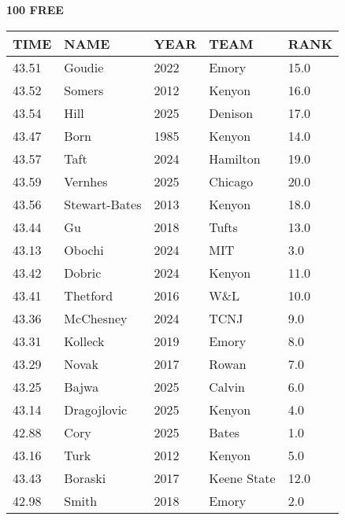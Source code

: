 \begin{table}[H]
\begin{minipage}[t]{0.48\textwidth}
\centering
\textbf{100 FREE}\\[0.1cm]
\begin{tabular}{@{}p{1.8cm}p{2.8cm}p{1.2cm}p{1.4cm}p{0.8cm}@{}}
\hline
    \textbf{TIME} & \textbf{NAME} & \textbf{YEAR} & \textbf{TEAM} & \textbf{RANK} \\
\hline
    43.51 & Goudie & 2022 & Emory & 15.0 \\
    43.52 & Somers & 2012 & Kenyon & 16.0 \\
    43.54 & Hill & 2025 & Denison & 17.0 \\
    43.47 & Born & 1985 & Kenyon & 14.0 \\
    43.57 & Taft & 2024 & Hamilton & 19.0 \\
    43.59 & Vernhes & 2025 & Chicago & 20.0 \\
    43.56 & Stewart-Bates & 2013 & Kenyon & 18.0 \\
    43.44 & Gu & 2018 & Tufts & 13.0 \\
    43.13 & Obochi & 2024 & MIT & 3.0 \\
    43.42 & Dobric & 2024 & Kenyon & 11.0 \\
    43.41 & Thetford & 2016 & W\&L & 10.0 \\
    43.36 & McChesney & 2024 & TCNJ & 9.0 \\
    43.31 & Kolleck & 2019 & Emory & 8.0 \\
    43.29 & Novak & 2017 & Rowan & 7.0 \\
    43.25 & Bajwa & 2025 & Calvin & 6.0 \\
    43.14 & Dragojlovic & 2025 & Kenyon & 4.0 \\
    42.88 & Cory & 2025 & Bates & 1.0 \\
    43.16 & Turk & 2012 & Kenyon & 5.0 \\
    43.43 & Boraski & 2017 & Keene State & 12.0 \\
    42.98 & Smith & 2018 & Emory & 2.0 \\
\hline
\end{tabular}
\end{minipage}
\end{table}

